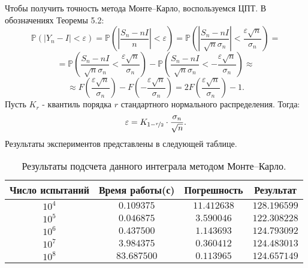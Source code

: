 \documentclass[a4paper, 11pt]{article}
\theoremstyle{def}
\theoremstyle{th}
\theoremstyle{rem}
\newcommand{\p}{\mathbb{P}}
\begin{document}
Чтобы получить точность метода Монте--Карло, воспользуемся ЦПТ. В обозначениях Теоремы 5.2:
$$
        \p(|Y_n - I| < \varepsilon)
        =
        \p\left( \left| \frac{S_n - nI}{n} \right| < \varepsilon \right)
        =
        \p\left( \left| \frac{S_n - nI}{\sqrt{n}\sigma_n} \right| < \frac{\varepsilon\sqrt{n}}{\sigma_n} \right)
        =
$$
$$
        =
        \p\left( \frac{S_n - nI}{\sqrt{n}\sigma_n}  < \frac{\varepsilon\sqrt{n}}{\sigma_n} \right)
        -
        \p\left( \frac{S_n - nI}{\sqrt{n}\sigma_n}  < -\frac{\varepsilon\sqrt{n}}{\sigma_n} \right)
        \approx
$$
$$
        \approx F\left(\frac{\varepsilon\sqrt{n}}{\sigma_n}\right) - F\left(-\frac{\varepsilon\sqrt{n}}{\sigma_n}\right)
        =
        2 F\left(\frac{\varepsilon\sqrt{n}}{\sigma_n}\right) - 1.
$$
Пусть $K_r$ - квантиль порядка $r$ стандартного нормального распределения. Тогда:
$$
\varepsilon = K_{1 - \nicefrac{r}{2}}\cdot \frac{\sigma_n}{\sqrt{n}}.
$$
Результаты экспериментов представлены в следующей таблице.

\begin{table}[h]
\begin{center}
\begin{tabular}{|c|c|c|c|}
\hline
Число испытаний &
Время работы(с)  &
Погрешность &
Результат
\\
\hline
$10^4$
&
$0.109375$
&
$11.412638$
&
$128.196599$
\\
\hline
$10^5$
&
$0.046875$
&
$3.590046$
&
$122.308228$
\\
\hline
$10^6$
&
$0.437500$
&
$1.143693$
&
$124.793092$
\\
\hline
$10^7$
&
$3.984375$
&
$0.360412$
&
$124.483013$
\\
\hline
$10^8$
&
$83.687500$
&
$0.113965$
&
$124.657149$
\\
\hline
\end{tabular}
\end{center}
\caption{Результаты подсчета данного интеграла методом Монте--Карло.}
\end{table}
\end{document}
